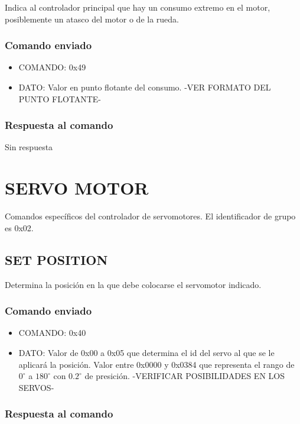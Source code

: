 \documentclass[a4paper,10pt]{article}
\begin{document}
Indica al controlador principal que hay un consumo extremo en el motor, posiblemente un atasco del motor o de la rueda.

\subsubsection*{Comando enviado}

\begin{itemize}
	\item{COMANDO:} 0x49
	\item{DATO:} Valor en punto flotante del consumo. -VER FORMATO DEL PUNTO FLOTANTE-
\end{itemize}

\subsubsection*{Respuesta al comando}

Sin respuesta

\section{SERVO MOTOR}
\label{grupo_servo_motor}

Comandos espec\'ificos del controlador de servomotores.
El identificador de grupo es 0x02.

\subsection{SET POSITION}
\label{set_position}

Determina la posici\'on en la que debe colocarse el servomotor indicado.

\subsubsection*{Comando enviado}

\begin{itemize}
	\item{COMANDO:} 0x40
	\item{DATO:} Valor de 0x00 a 0x05 que determina el id del servo al que se le aplicar\'a la posici\'on.
	Valor entre 0x0000 y 0x0384 que representa el rango de $0^{\circ}$ a $180^{\circ}$ con $0.2^{\circ}$ de presici\'on. -VERIFICAR POSIBILIDADES EN LOS SERVOS-
\end{itemize}

\subsubsection*{Respuesta al comando}
\end{document}
